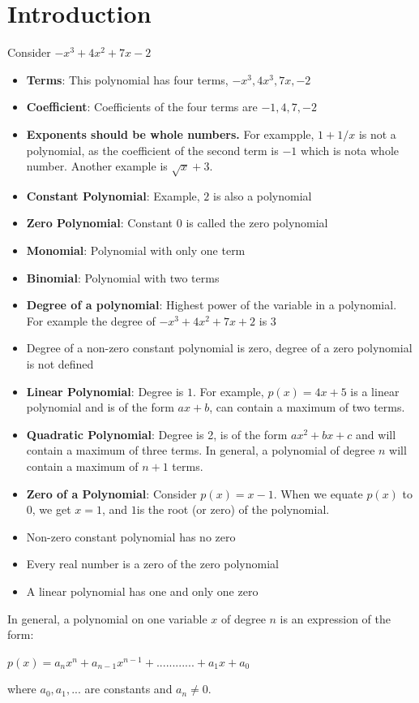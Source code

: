 \documentclass{book}
\begin{document}
	\section{Introduction}
	Consider $-x^3 + 4x^2 +7x -2$
	\begin{itemize}
		\item \textbf{Terms}: This polynomial has four terms, $-x^3, 4x^3, 7x,-2$
		\item \textbf{Coefficient}: Coefficients of the four terms are $-1,4,7,-2$
		\item \textbf{Exponents should be whole numbers.} For exampple, $1 + 1/x$ is not a polynomial, as the coefficient of the second term is $-1$ which is nota whole number. Another example is $\sqrt{x} + 3$.
		\item \textbf{Constant Polynomial}: Example, $2$ is also a polynomial
		\item \textbf{Zero Polynomial}: Constant $0$ is called the zero polynomial
		\item \textbf{Monomial}: Polynomial with only one term
		\item \textbf{Binomial}: Polynomial with two terms
		\item \textbf{Degree of a polynomial}: Highest power of the variable in a polynomial. For example the degree of $-x^3 + 4x^2 + 7x + 2$ is $3$
		\item Degree of a non-zero constant polynomial is zero, degree of a zero polynomial is not defined
		\item \textbf{Linear Polynomial}: Degree is $1$. For example, $p(x) = 4x + 5$ is a linear polynomial and is of the form $ax + b$, can contain a maximum of two terms.
		\item \textbf{Quadratic Polynomial}: Degree is 2, is of the form $ax^2 + bx + c$ and will contain a maximum of three terms. In general, a polynomial of degree $n$ will contain a maximum of $n+1$ terms.
		\item \textbf{Zero of a Polynomial}: Consider $p(x) = x -1$. When we equate $p(x)$ to $0$, we get $x=1$, and $1$is the root (or zero) of the polynomial. 
		\item Non-zero constant polynomial has no zero
		\item Every real number is a zero of the zero polynomial
		\item A linear polynomial has one and only one zero \\
	\end{itemize}
In general, a polynomial on one variable $x$ of	degree $n$ is an expression of the form: \\
	\begin{mdframed}[backgroundcolor=yellow]
		$p(x) = a_nx^n + a_{n-1}x^{n-1} + ............ + a_1x + a_0$
	\end{mdframed}
where $a_0, a_1,...$ are constants and $a_n \neq 0$.
		
\end{document}
